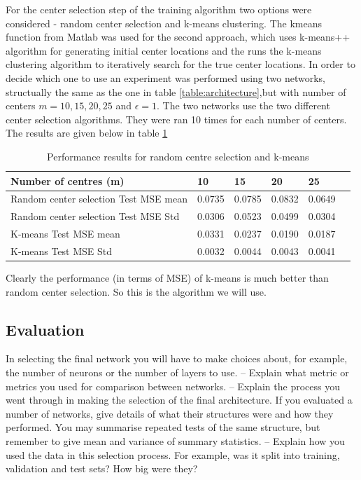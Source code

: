 \documentclass[a4paper, 11pt]{article}
\begin{document}
For the center selection step of the training algorithm two options were considered - random center selection and k-means clustering. The kmeans function from Matlab was used for the second approach, which uses k-means++ algorithm \cite{Arthur2007} for generating initial center locations and the runs the k-means clustering algorithm \cite{Lloyd82} to iteratively search for the true center locations. In order to decide which one to use an experiment was performed using two networks, structually the same as the one in table \ref{table:architecture},but with number of centers $m = 10, 15, 20, 25$ and $\epsilon = 1$. The two networks use the two different center selection algorithms. They were ran 10 times for each number of centers. The results are given below in table \ref{table:centermse}

\begin{table}[h]
\centering
\begin{tabular}{| l | l | l | l | l | l |}
\hline
Number of centres (m) & 10 & 15 & 20 & 25 \\
\hline
Random center selection Test MSE mean & 0.0735 & 0.0785 & 0.0832 & 0.0649 \\
\hline
Random center selection Test MSE Std & 0.0306 & 0.0523 & 0.0499 & 0.0304 \\
\hline
K-means Test MSE mean & 0.0331 & 0.0237 & 0.0190 & 0.0187 \\
\hline
K-means Test MSE Std & 0.0032 & 0.0044 & 0.0043 & 0.0041 \\
\hline
\end{tabular}
\caption{Performance results for random centre selection and k-means}
\label{table:centermse}
\end{table}

Clearly the performance (in terms of MSE) of k-means is much better than random center selection. So this is the algorithm we will use.

\subsection*{Evaluation}
In selecting the final network you will have to make choices about, for
example, the number of neurons or the number of layers to use.
– Explain what metric or metrics you used for comparison between
networks.
– Explain the process you went through in making the selection of
the final architecture. If you evaluated a number of networks, give
details of what their structures were and how they performed. You
may summarise repeated tests of the same structure, but remember
to give mean and variance of summary statistics.
– Explain how you used the data in this selection process. For example,
was it split into training, validation and test sets? How big were
they?
\end{document}
